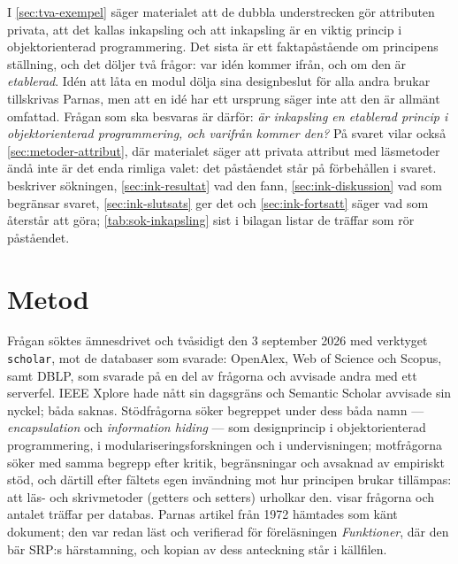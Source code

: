 I \cref{sec:tva-exempel} säger materialet att de dubbla understrecken
gör attributen privata, att det kallas inkapsling och att inkapsling är
en viktig princip i objektorienterad programmering.  Det sista är ett
faktapåstående om principens ställning, och det döljer två frågor: var
idén kommer ifrån, och om den är \emph{etablerad}.  Idén att låta en
modul dölja sina designbeslut för alla andra brukar tillskrivas
Parnas\autocite{Parnas1972Criteria}, men att en idé har ett ursprung
säger inte att den är allmänt omfattad.  Frågan som ska besvaras är
därför: \emph{är inkapsling en etablerad princip i objektorienterad
programmering, och varifrån kommer den?}  På svaret vilar också
\cref{sec:metoder-attribut}, där materialet säger att privata attribut
med läsmetoder ändå inte är det enda rimliga valet: det påståendet står
på förbehållen i svaret.  
beskriver sökningen, \cref{sec:ink-resultat} vad den fann,
\cref{sec:ink-diskussion} vad som begränsar svaret,
\cref{sec:ink-slutsats} ger det och \cref{sec:ink-fortsatt} säger vad
som återstår att göra; \cref{tab:sok-inkapsling} sist i
bilagan listar de träffar som rör påståendet.

\section{Metod}
\label{sec:ink-metod}

Frågan söktes ämnesdrivet och tvåsidigt den 3 september 2026 med
verktyget \texttt{scholar}, mot de databaser som svarade: OpenAlex, Web
of Science och Scopus, samt DBLP, som svarade på en del av frågorna och
avvisade andra med ett serverfel.  IEEE Xplore hade nått sin dagsgräns
och Semantic Scholar avvisade sin nyckel; båda saknas.  Stödfrågorna
söker begreppet under dess båda namn --- \emph{encapsulation} och
\emph{information hiding} --- som designprincip i objektorienterad
programmering, i modulariseringsforskningen och i undervisningen;
motfrågorna söker med samma begrepp efter kritik, begränsningar och
avsaknad av empiriskt stöd, och därtill efter fältets egen invändning
mot hur principen brukar tillämpas: att läs- och skrivmetoder
(\foreignlanguage{english}{getters} och
\foreignlanguage{english}{setters}) urholkar den.
 visar frågorna och antalet träffar per
databas.
Parnas artikel från 1972 hämtades som känt dokument; den var redan läst
och verifierad för föreläsningen \emph{Funktioner}, där den bär SRP:s
härstamning, och kopian av dess anteckning står i källfilen.


